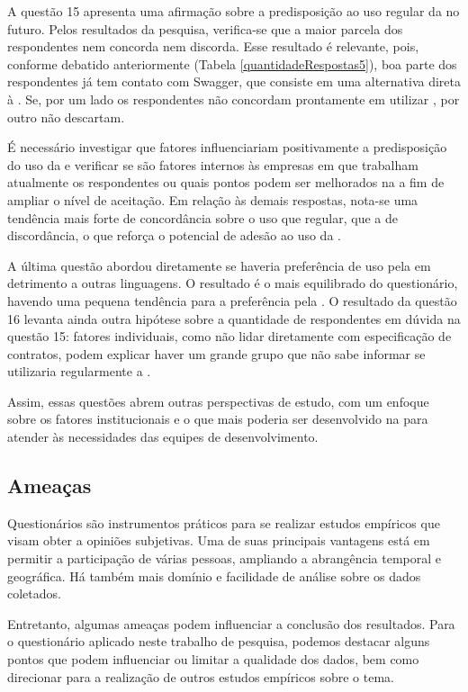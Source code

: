 A questão 15 apresenta uma afirmação sobre a predisposição ao uso regular da
\neoidl{} no futuro. Pelos resultados da pesquisa, verifica-se que a maior
parcela dos respondentes nem concorda nem discorda. Esse resultado é relevante,
pois, conforme debatido anteriormente (Tabela \ref{quantidadeRespostas5}), boa
parte dos respondentes já tem contato com Swagger, que consiste em uma
alternativa direta à \neoidl{}.
Se, por um lado os respondentes não concordam prontamente em utilizar \neoidl{}, por
outro não descartam.

É necessário investigar que fatores influenciariam positivamente a predisposição
do uso da \neoidl{} e verificar se são fatores internos às empresas em que
trabalham atualmente os respondentes ou quais pontos podem ser melhorados na
\neoidl{} a fim de ampliar o nível de aceitação. Em relação às demais respostas,
nota-se uma tendência mais forte de concordância sobre o uso que regular, que
a de discordância, o que reforça o potencial de adesão ao uso da \neoidl{}.

A última questão abordou diretamente se haveria preferência de uso pela
\neoidl{} em detrimento a outras linguagens. O resultado é o mais equilibrado do
questionário, havendo uma pequena tendência para a preferência pela \neoidl{}.
O resultado da questão 16 levanta ainda outra hipótese sobre a quantidade de
respondentes em dúvida na questão 15: fatores individuais, como não lidar
diretamente com especificação de contratos, podem explicar haver um grande grupo
que não sabe informar se utilizaria regularmente a \neoidl{}.

Assim, essas questões abrem outras perspectivas de estudo, com um enfoque sobre
os fatores institucionais e o que mais poderia ser desenvolvido na \neoidl{}
para atender às necessidades das equipes de desenvolvimento.

\subsection{Ameaças}
\label{AmeacaoEstudoSubjetivo}
 
Questionários são instrumentos práticos para se realizar estudos empíricos que
visam obter a opiniões subjetivas. Uma de suas principais vantagens está em
permitir a participação de várias pessoas, ampliando a abrangência temporal e
geográfica. Há também mais domínio e facilidade de análise sobre os dados
coletados.

Entretanto, algumas ameaças podem influenciar a conclusão dos resultados. Para o
questionário aplicado neste trabalho de pesquisa, podemos destacar alguns pontos
que podem influenciar ou limitar a qualidade dos dados, bem como direcionar para
a rea\-li\-za\-ção de outros estudos empíricos sobre o tema.

